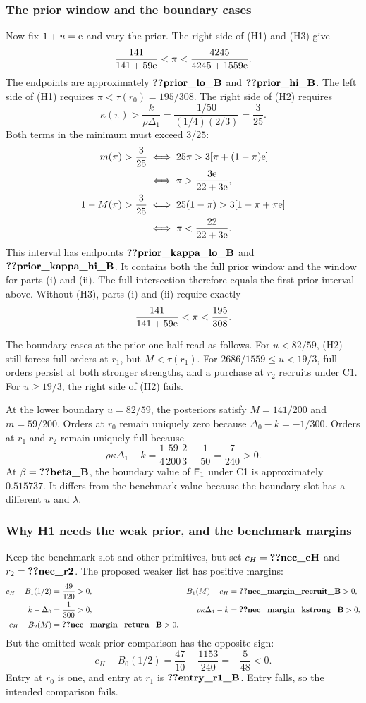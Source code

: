 \subsubsection{The prior window and the boundary cases}\label{sec:benchmark-priors}
Now fix $1+u=\mathrm{e}$ and vary the prior.
The right side of (H1) and (H3) give
\[
\frac{141}{141+59\mathrm{e}}<\pi<\frac{4245}{4245+1559\mathrm{e}}.
\]
The endpoints are approximately $\reg{prior_lo_B}$ and $\reg{prior_hi_B}$.
The left side of (H1) requires $\pi<\tau(r_0)=195/308$.
The right side of (H2) requires
\[
\kappa(\pi)>\frac{k}{\rho\Delta_1}=\frac{1/50}{(1/4)(2/3)}=\frac3{25}.
\]
Both terms in the minimum must exceed $3/25$:
\begin{align*}
m(\pi)>\frac3{25}
&\iff 25\pi>3[\pi+(1-\pi)\mathrm{e}]\\
&\iff\pi>\frac{3\mathrm{e}}{22+3\mathrm{e}},\\
1-M(\pi)>\frac3{25}
&\iff25(1-\pi)>3[1-\pi+\pi\mathrm{e}]\\
&\iff\pi<\frac{22}{22+3\mathrm{e}}.
\end{align*}
This interval has endpoints $\reg{prior_kappa_lo_B}$ and $\reg{prior_kappa_hi_B}$.
It contains both the full prior window and the window for parts (i) and (ii).
The full intersection therefore equals the first prior interval above.
Without (H3), parts (i) and (ii) require exactly
\[
\frac{141}{141+59\mathrm{e}}<\pi<\frac{195}{308}.
\]

The boundary cases at the prior one half read as follows.
For $u<82/59$, (H2) still forces full orders at $r_1$, but $M<\tau(r_1)$.
For $2686/1559\le u<19/3$, full orders persist at both stronger strengths, and a purchase at $r_2$ recruits under C1.
For $u\ge19/3$, the right side of (H2) fails.

At the lower boundary $u=82/59$, the posteriors satisfy $M=141/200$ and $m=59/200$.
Orders at $r_0$ remain uniquely zero because $\Delta_0-k=-1/300$.
Orders at $r_1$ and $r_2$ remain uniquely full because
\[
\rho\kappa\Delta_1-k
=\frac14\frac{59}{200}\frac23-\frac1{50}=\frac7{240}>0.
\]
At $\beta=\reg{beta_B}$, the boundary value of $\mathsf{E}_1$ under C1 is approximately $0.515737$. %
It differs from the benchmark value because the boundary slot has a different $u$ and $\lambda$.

\subsubsection{Why H1 needs the weak prior, and the benchmark margins}\label{sec:benchmark-scope}
Keep the benchmark slot and other primitives, but set $c_H=\reg{nec_cH}$ and $r_2=\reg{nec_r2}$.
The proposed weaker list has positive margins:
\begin{align*}
c_H-B_1(1/2)&=\frac{49}{120}>0,& B_1(M)-c_H&=\reg{nec_margin_recruit_B}>0,\\
k-\Delta_0&=\frac1{300}>0,& \rho\kappa\Delta_1-k&=\reg{nec_margin_kstrong_B}>0,\\
c_H-B_2(M)&=\reg{nec_margin_return_B}>0.
\end{align*}
But the omitted weak-prior comparison has the opposite sign:
\[
c_H-B_0(1/2)=\frac{47}{10}-\frac{1153}{240}=-\frac5{48}<0.
\]
Entry at $r_0$ is one, and entry at $r_1$ is $\reg{entry_r1_B}$.
Entry falls, so the intended comparison fails.

